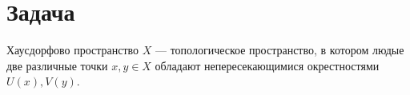 \section{Задача}

{ Хаусдорфово пространство $X$} --- топологическое пространство, в котором людые две различные точки $x, y \in X$ обладают непересекающимися окрестностями $U(x), V(y)$.
